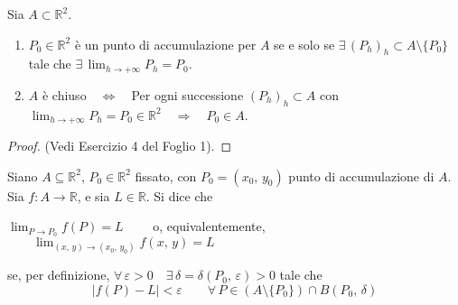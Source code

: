 \begin{proposition}
Sia $A \subset \mathbb{R}^2$.
\begin{enumerate}[labelindent=\parindent,leftmargin=*,label=\textnormal{(\roman*)},start=1]
\item $P_0 \in \mathbb{R}^2$ è un punto di accumulazione per $A$ se e solo se $\exists \, (P_h)_h \subset A \setminus \lbrace P_0 \rbrace$ tale che $\exists \, \displaystyle \lim_{h \rightarrow +\infty} P_h = P_0$.
\item $A$ è chiuso$\quad \Longleftrightarrow \quad$Per ogni successione $(P_h)_h \subset A$ con $\displaystyle \lim_{h \rightarrow +\infty} P_h = P_0 \in \mathbb{R}^2 \quad \Rightarrow \quad P_0 \in A$.
\end{enumerate}
\end{proposition}
\begin{proof}
(Vedi Esercizio 4 del Foglio 1).
\end{proof}

\begin{definition}
Siano $A \subseteq \mathbb{R}^2$, $P_0 \in \mathbb{R}^2$ fissato, con $P_0=(x_0,\, y_0)$ punto di accumulazione di $A$. Sia $f : A \longrightarrow \mathbb{R}$, e sia $L \in \mathbb{R}$.
Si dice che
\begin{center}
$\displaystyle \lim_{P \rightarrow P_0} f(P) = L \qquad$
o, equivalentemente,
$\displaystyle \qquad \lim_{(x,\, y) \rightarrow (x_0,\, y_0)} f(x,\, y) = L$
\end{center}
se, per definizione, $\forall \, \varepsilon > 0 \quad \exists \, \delta = \delta(P_0,\, \varepsilon) > 0$ tale che
$$|f(P) - L| < \varepsilon \qquad \forall \, P \in (A \setminus \lbrace P_0 \rbrace) \cap B(P_0,\, \delta)$$
\end{definition}

